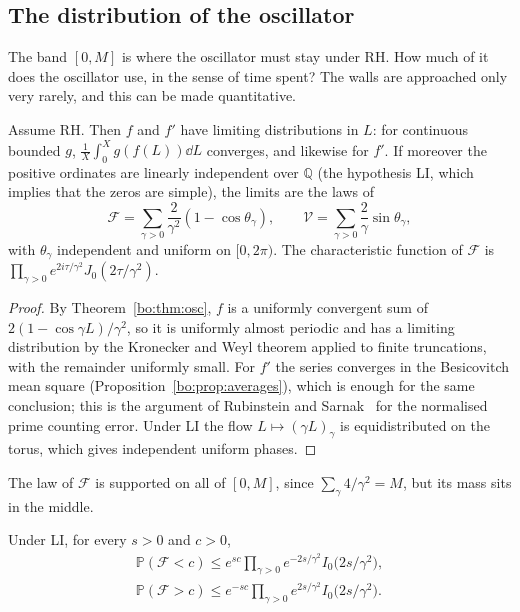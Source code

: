 \subsection{The distribution of the oscillator}\label{bo:sec:oscdist}

The band $[0,M]$ is where the oscillator must stay under RH. How much of it does the oscillator use, in the sense of time spent? The walls are approached only very rarely, and this can be made quantitative.

\begin{proposition}\label{bo:prop:oscdist}
Assume RH. Then $f$ and $f'$ have limiting distributions in $L$: for continuous bounded $g$, $\frac1X\int_0^Xg(f(L))\dd L$ converges, and likewise for $f'$. If moreover the positive ordinates are linearly independent over $\mathbb Q$ (the hypothesis LI, which implies that the zeros are simple), the limits are the laws of
\[
\mathcal F=\sum_{\gamma>0}\frac{2}{\gamma^2}(1-\cos\theta_\gamma),\qquad \mathcal V=\sum_{\gamma>0}\frac{2}{\gamma}\sin\theta_\gamma,
\]
with $\theta_\gamma$ independent and uniform on $[0,2\pi)$. The characteristic function of $\mathcal F$ is $\prod_{\gamma>0}e^{2i\tau/\gamma^2}J_0(2\tau/\gamma^2)$.
\end{proposition}

\begin{proof}
By Theorem~\ref{bo:thm:osc}, $f$ is a uniformly convergent sum of $2(1-\cos\gamma L)/\gamma^2$, so it is uniformly almost periodic and has a limiting distribution by the Kronecker and Weyl theorem applied to finite truncations, with the remainder uniformly small. For $f'$ the series converges in the Besicovitch mean square (Proposition~\ref{bo:prop:averages}), which is enough for the same conclusion; this is the argument of Rubinstein and Sarnak~\cite{RubinsteinSarnak94} for the normalised prime counting error. Under LI the flow $L\mapsto(\gamma L)_\gamma$ is equidistributed on the torus, which gives independent uniform phases.
\end{proof}

The law of $\mathcal F$ is supported on all of $[0,M]$, since $\sum_\gamma4/\gamma^2=M$, but its mass sits in the middle.

\begin{corollary}\label{bo:cor:walls}
Under LI, for every $s>0$ and $c>0$,
\begin{gather*}
\mathbb P(\mathcal F<c)\le e^{sc}\prod_{\gamma>0}e^{-2s/\gamma^2}I_0\bigl(2s/\gamma^2\bigr),\\
\mathbb P(\mathcal F>c)\le e^{-sc}\prod_{\gamma>0}e^{2s/\gamma^2}I_0\bigl(2s/\gamma^2\bigr).
\end{gather*}
\end{corollary}

